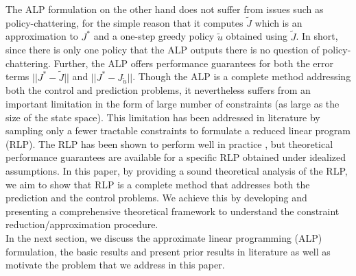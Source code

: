 \documentclass[12pt,draftcls,onecolumn]{IEEEtran}
\begin{document}
The ALP formulation \cite{ALP} on the other hand does not suffer from issues such as policy-chattering, for the simple reason that it computes $\tilde{J}$ which is an approximation to $J^*$ and a one-step greedy policy $\tilde{u}$ obtained using $\tilde{J}$. In short, since there is only one policy that the ALP outputs there is no question of policy-chattering. Further, the ALP offers performance guarantees for both the error terms $||J^*-\tilde{J}||$ and $||J^*-J_{\tilde{u}}||$. Though the ALP is a complete method addressing both the control and prediction problems, it nevertheless suffers from an important limitation in the form of large number of constraints (as large as the size of the state space). This limitation has been addressed in literature by sampling only a fewer tractable constraints to formulate a reduced linear program (RLP). The RLP has been shown to perform well in practice \cite{ALP,CS,CST}, but theoretical performance guarantees \cite{CS} are available for a specific RLP obtained under idealized assumptions. In this paper, by providing a sound theoretical analysis of the RLP, we aim to show that RLP is a complete method that addresses both the prediction and the control problems.
We achieve this by developing and presenting a comprehensive theoretical framework to understand the constraint reduction/approximation procedure.\\
In the next section, we discuss the approximate linear programming (ALP) formulation, the basic results and present prior results in literature as well as motivate the problem that we address in this paper. 
\end{document}
